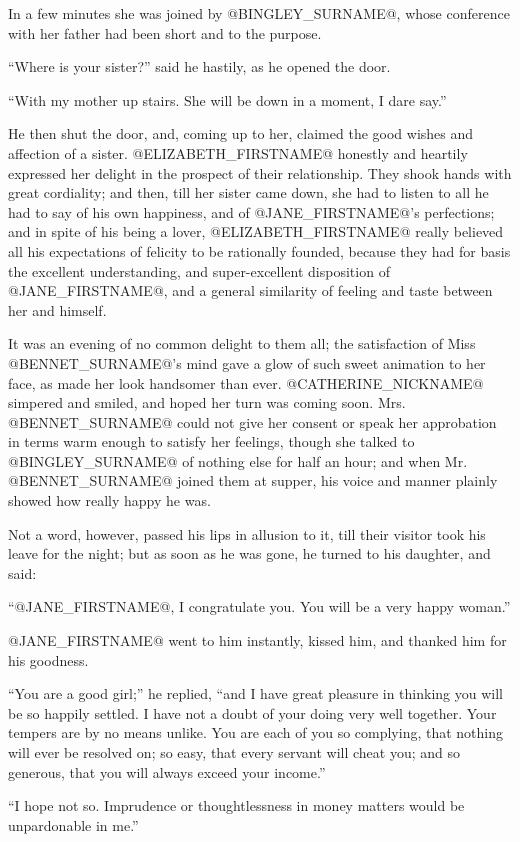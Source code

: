 In a few minutes she was joined by @BINGLEY_SURNAME@, whose conference with her
father had been short and to the purpose.

``Where is your sister?'' said he hastily, as he opened the door.

``With my mother up stairs. She will be down in a moment, I dare say.''

He then shut the door, and, coming up to her, claimed the good wishes
and affection of a sister. @ELIZABETH_FIRSTNAME@ honestly and heartily expressed
her delight in the prospect of their relationship. They shook hands with
great cordiality; and then, till her sister came down, she had to listen
to all he had to say of his own happiness, and of @JANE_FIRSTNAME@'s perfections;
and in spite of his being a lover, @ELIZABETH_FIRSTNAME@ really believed all his
expectations of felicity to be rationally founded, because they had for
basis the excellent understanding, and super-excellent disposition of
@JANE_FIRSTNAME@, and a general similarity of feeling and taste between her and
himself.

It was an evening of no common delight to them all; the satisfaction of
Miss @BENNET_SURNAME@'s mind gave a glow of such sweet animation to her face, as
made her look handsomer than ever. @CATHERINE_NICKNAME@ simpered and smiled, and hoped
her turn was coming soon. Mrs. @BENNET_SURNAME@ could not give her consent or
speak her approbation in terms warm enough to satisfy her feelings,
though she talked to @BINGLEY_SURNAME@ of nothing else for half an hour; and when
Mr. @BENNET_SURNAME@ joined them at supper, his voice and manner plainly showed
how really happy he was.

Not a word, however, passed his lips in allusion to it, till their
visitor took his leave for the night; but as soon as he was gone, he
turned to his daughter, and said:

``@JANE_FIRSTNAME@, I congratulate you. You will be a very happy woman.''

@JANE_FIRSTNAME@ went to him instantly, kissed him, and thanked him for his
goodness.

``You are a good girl;'' he replied, ``and I have great pleasure in
thinking you will be so happily settled. I have not a doubt of your
doing very well together. Your tempers are by no means unlike. You are
each of you so complying, that nothing will ever be resolved on; so
easy, that every servant will cheat you; and so generous, that you will
always exceed your income.''

``I hope not so. Imprudence or thoughtlessness in money matters would be
unpardonable in me.''

